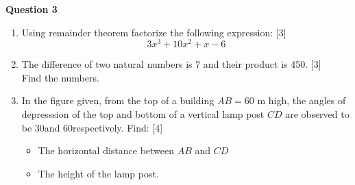 \par
\noindent
\textbf{Question 3}\\
\begin{enumerate}[label=(\roman*)]

    \item Using remainder theorem factorize the following expression: \hfill [3]
        \[
            3x^3 + 10x^2 + x - 6
        \]

    \item The difference of two natural numbers is 7 and their product 
        is 450. \hfill [3]\\
        Find the numbers.

    \item In the figure given, from the top of a building $AB = 60$ m high,
        the angles of depresssion of the top and bottom of a vertical lamp post 
        $CD$ are observed to be 30\degree and 60\degree respectively. Find: \hfill [4]
        \begin{itemize}
            \setlength\itemsep{0em}
            \item The horizontal distance between $AB$ and $CD$
            \item The height of the lamp post.
        \end{itemize}


\end{enumerate}

